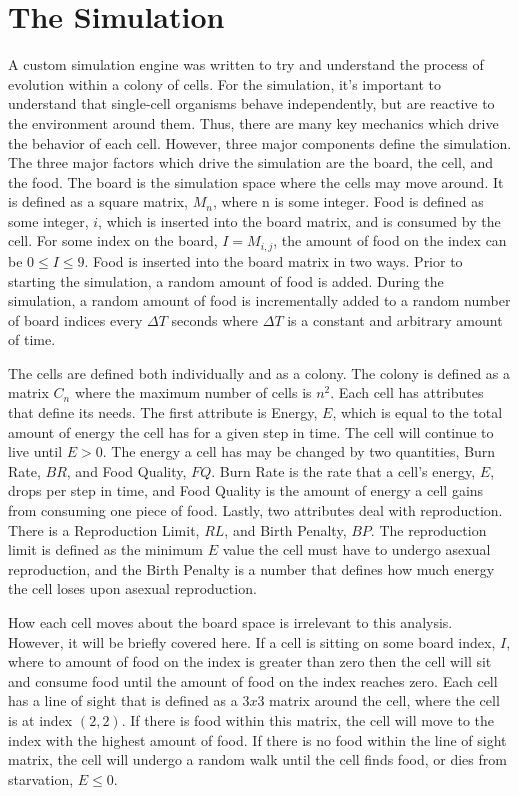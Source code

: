 \documentclass[12pt]{article}
\begin{document}
\section{The Simulation}

	A custom simulation engine was written to try and understand the process of evolution within a colony of cells. 
	For the simulation, it's important to understand that single-cell organisms behave independently, but are reactive to the environment around them. 
	Thus, there are many key mechanics which drive the behavior of each cell. 
	However, three major components define the simulation. 
	The three major factors which drive the simulation are the board, the cell, and the food. 
	The board is the simulation space where the cells may move around. 
	It is defined as a square matrix, $M_{n}$, where n is some integer. 
	Food is defined as some integer, $i$, which is inserted into the board matrix, and is consumed by the cell. 
	For some index on the board, $I = M_{i,j}$, the amount of food on the index can be $0 \leq I \leq 9$. 
	Food is inserted into the board matrix in two ways. 
	Prior to starting the simulation, a random amount of food is added. 
	During the simulation, a random amount of food is incrementally added to a random number of board indices every $\Delta T$ seconds where $\Delta T$ is a constant and arbitrary amount of time.

	The cells are defined both individually and as a colony. The colony is defined as a matrix $C_n$ where the maximum number of cells is $n^2$. 
	Each cell has attributes that define its needs. 
	The first attribute is Energy, $E$, which is equal to the total amount of energy the cell has for a given step in time. 
	The cell will continue to live until $E > 0$. 
	The energy a cell has may be changed by two quantities, Burn Rate, $BR$, and Food Quality, $FQ$. 
	Burn Rate is the rate that a cell's energy, $E$, drops per step in time, and Food Quality is the amount of energy a cell gains from consuming one piece of food. 
	Lastly, two attributes deal with reproduction. 
	There is a Reproduction Limit, $RL$, and Birth Penalty, $BP$. 
	The reproduction limit is defined as the minimum $E$ value the cell must have to undergo asexual reproduction, and the Birth Penalty is a number that defines how much energy the cell loses upon asexual reproduction. 
 
	How each cell moves about the board space is irrelevant to this analysis. 
	However, it will be briefly covered here. 
	If a cell is sitting on some board index, $I$, where to amount of food on the index is greater than zero then the cell will sit and consume food until the amount of food on the index reaches zero. 
	Each cell has a line of sight that is defined as a $3x3$ matrix around the cell, where the cell is at index $(2,2)$. 
	If there is food within this matrix, the cell will move to the index with the highest amount of food. 
	If there is no food within the line of sight matrix, the cell will undergo a random walk until the cell finds food, or dies from starvation, $E \leq 0$.
\end{document}
